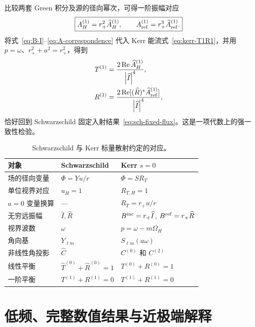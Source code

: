 \documentclass[UTF8,fontset=fandol,11pt,a4paper]{ctexart}
\newcommand{\Bin}{B^{\rm inc}}
\newcommand{\Bref}{B^{\rm ref}}
\newcommand{\abs}[1]{\left|#1\right|}
\newcommand{\Ree}{\operatorname{Re}}
\begin{document}
比较两套 Green 积分及源的径向幂次，可得一阶振幅对应
\begin{equation}
\boxed{
A_H^{(1)}=r_+^2\widehat A_H^{(1)},\qquad
A_{\rm ref}^{(1)}=r_+^3\widehat A_{\rm ref}^{(1)}.}
\label{eq:A-correspondence}
\end{equation}
将式~\eqref{eq:B-I}--\eqref{eq:A-correspondence} 代入 Kerr 能流式~\eqref{eq:kerr-T1R1}，并用 $p=\omega$、$r_+^2+a^2=r_+^2$，得到
\begin{align}
T^{(1)}&=\frac{2\Ree\widehat A_H^{(1)}}{\abs{\widehat I}^4},\\
R^{(1)}&=\frac{2\Ree[(\widehat R)^*\widehat A_{\rm ref}^{(1)}]}
{\abs{\widehat I}^4},
\end{align}
恰好回到 Schwarzschild 固定入射结果~\eqref{eq:sch-fixed-flux}。这是一项代数上的强一致性检验。

\begin{table}[htbp]
\centering
\caption{Schwarzschild 与 Kerr 标量散射约定的对应。}
\label{tab:correspondence}
\begin{tabularx}{\textwidth}{>{\raggedright\arraybackslash}p{}XX}
\toprule
对象 & Schwarzschild & Kerr $s=0$ \\
\midrule
场的径向变量 & $\Phi=Yu/r$ & $\Phi=SR_T$ \\
单位视界对应 & $u_H=1$ & $R_{T,H}=1$ \\
$a=0$ 变量换算 & --- & $R_T=r_+u/r$ \\
无穷远振幅 & $\widehat I,\widehat R$ & $\Bin=r_+\widehat I$, $\Bref=r_+\widehat R$ \\
视界波数 & $\omega$ & $p=\omega-m\Omega_H$ \\
角向基 & $Y_{\ell m}$ & $S_{\ell m}(a\omega)$ \\
非线性角投影 & $\widehat C$ & $C^{(0)}$ 和 $C^{(2)}$ \\
线性平衡 & $\widehat T^{(0)}+\widehat R^{(0)}=1$ & $T^{(0)}+R^{(0)}=1$ \\
一阶平衡 & $T^{(1)}+R^{(1)}=0$ & $T^{(1)}+R^{(1)}=0$ \\
\bottomrule
\end{tabularx}
\end{table}

\clearpage
{}\part{低频、完整数值结果与近极端解释}
\end{document}
